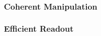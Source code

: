 \subsubsection{Coherent Manipulation}
\cite{Widmann2014}

\cite{PhysRevB.105.165108}

\cite{Yan2020}


\cite{Koehl2011}

\cite{Mu2020}


\cite{PhysRevLett.124.223601}

\subsubsection{Efficient Readout}

